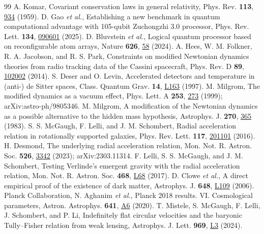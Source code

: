 \documentclass[aps,prd,twocolumn,superscriptaddress,nofootinbib,showkeys]{revtex4-2}
\begin{document}
\begin{thebibliography}{99}
 A. Komar, Covariant conservation laws in general relativity, Phys. Rev. \textbf{113}, \href{https://doi.org/10.1103/PhysRev.113.934}{934} (1959).
 D. Gao \emph{et al.}, Establishing a new benchmark in quantum computational advantage with 105-qubit Zuchongzhi 3.0 processor, Phys. Rev. Lett. \textbf{134}, \href{https://doi.org/10.1103/PhysRevLett.134.090601}{090601} (2025).
 D. Bluvstein \emph{et al.}, Logical quantum processor based on reconfigurable atom arrays, Nature \textbf{626}, \href{https://doi.org/10.1038/s41586-023-06927-3}{58} (2024).
 A. Hees, W. M. Folkner, R. A. Jacobson, and R. S. Park, Constraints on modified Newtonian dynamics theories from radio tracking data of the Cassini spacecraft, Phys. Rev. D \textbf{89}, \href{https://doi.org/10.1103/PhysRevD.89.102002}{102002} (2014).
 S. Deser and O. Levin, Accelerated detectors and temperature in (anti-) de Sitter spaces, Class. Quantum Grav. \textbf{14}, \href{https://doi.org/10.1088/0264-9381/14/9/003}{L163} (1997).
 M. Milgrom, The modified dynamics as a vacuum effect, Phys. Lett. A \textbf{253}, \href{https://doi.org/10.1016/S0375-9601(99)00077-8}{273} (1999); arXiv:astro-ph/9805346.
 M. Milgrom, A modification of the Newtonian dynamics as a possible alternative to the hidden mass hypothesis, Astrophys. J. \textbf{270}, \href{https://doi.org/10.1086/161130}{365} (1983).
 S. S. McGaugh, F. Lelli, and J. M. Schombert, Radial acceleration relation in rotationally supported galaxies, Phys. Rev. Lett. \textbf{117}, \href{https://doi.org/10.1103/PhysRevLett.117.201101}{201101} (2016).
 H. Desmond, The underlying radial acceleration relation, Mon. Not. R. Astron. Soc. \textbf{526}, \href{https://doi.org/10.1093/mnras/stad2762}{3342} (2023); arXiv:2303.11314.
 F. Lelli, S. S. McGaugh, and J. M. Schombert, Testing Verlinde's emergent gravity with the radial acceleration relation, Mon. Not. R. Astron. Soc. \textbf{468}, \href{https://doi.org/10.1093/mnrasl/slx031}{L68} (2017).
 D. Clowe \emph{et al.}, A direct empirical proof of the existence of dark matter, Astrophys. J. \textbf{648}, \href{https://doi.org/10.1086/508162}{L109} (2006).
 Planck Collaboration, N. Aghanim \emph{et al.}, Planck 2018 results. VI. Cosmological parameters, Astron. Astrophys. \textbf{641}, \href{https://doi.org/10.1051/0004-6361/201833910}{A6} (2020).
 T. Mistele, S. McGaugh, F. Lelli, J. Schombert, and P. Li, Indefinitely flat circular velocities and the baryonic Tully--Fisher relation from weak lensing, Astrophys. J. Lett. \textbf{969}, \href{https://doi.org/10.3847/2041-8213/ad54b0}{L3} (2024).

\end{thebibliography}
\end{document}
